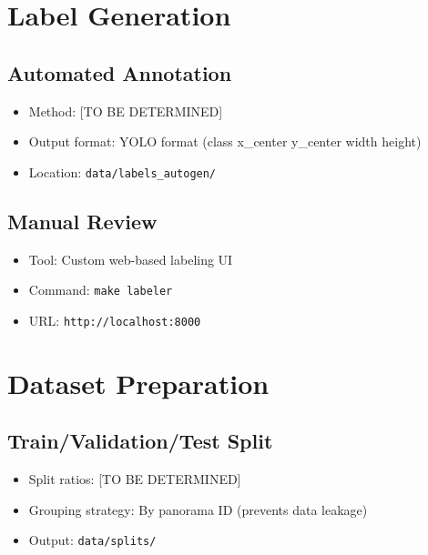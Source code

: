 \documentclass[12pt,a4paper]{article}
\begin{document}
\section{Label Generation}

\subsection{Automated Annotation}

\begin{itemize}
	\item Method: [TO BE DETERMINED]
	\item Output format: YOLO format (class x\_center y\_center width height)
	\item Location: \texttt{data/labels\_autogen/}
\end{itemize}

\subsection{Manual Review}

\begin{itemize}
	\item Tool: Custom web-based labeling UI
	\item Command: \texttt{make labeler}
	\item URL: \texttt{http://localhost:8000}
\end{itemize}

\section{Dataset Preparation}

\subsection{Train/Validation/Test Split}

\begin{itemize}
	\item Split ratios: [TO BE DETERMINED]
	\item Grouping strategy: By panorama ID (prevents data leakage)
	\item Output: \texttt{data/splits/}
\end{itemize}
\end{document}
